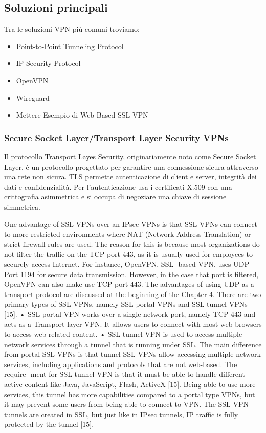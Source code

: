 \subsection{Soluzioni principali}
Tra le soluzioni VPN più comuni troviamo:
\begin{itemize}
    \item Point-to-Point Tunneling Protocol
    \item IP Security Protocol
    \item OpenVPN
    \item Wireguard
    \item Mettere Esempio di Web Based SSL VPN %
\end{itemize}

\subsubsection{Secure Socket Layer/Transport Layer Security VPNs}
Il protocollo Transport Layes Security, originariamente noto come Secure Socket Layer, è un protocollo progettato per garantire una connessione sicura attraverso una rete non sicura. TLS permette autenticazione di client e server, integrità dei dati e confidenzialità. Per l'autenticazione usa i certificati X.509 \cite[RFC5280]{RFC5280} con una crittografia asimmetrica e si occupa di negoziare una chiave di sessione simmetrica.


One advantage of SSL VPNs over an IPsec VPNs is that SSL VPNs can connect to more restricted environments where NAT (Network Address Translation) or strict firewall rules are used. The reason for this is because most organizations do not filter the traffic on the TCP port 443, as it is usually used for employees to securely access Internet. For instance, OpenVPN, SSL- based VPN, uses UDP Port 1194 for secure data transmission. However, in the case that port is filtered, OpenVPN can also make use TCP port 443. The advantages of using UDP as a transport protocol are discussed at the beginning of the Chapter 4.
There are two primary types of SSL VPNs, namely SSL portal VPNs and SSL tunnel VPNs [15].
• SSL portal VPN works over a single network port, namely TCP 443 and acts as a Transport layer VPN. It allows users to connect with most web browsers to access web related content.
• SSL tunnel VPN is used to access multiple network services through a tunnel that is running under SSL. The main difference from portal SSL VPNs is that tunnel SSL VPNs allow accessing multiple network services, including applications and protocols that are not web-based. The require- ment for SSL tunnel VPN is that it must be able to handle different active content like Java, JavaScript, Flash, ActiveX [15]. Being able to use more services, this tunnel has more capabilities compared to a portal type VPNs, but it may prevent some users from being able to connect to VPN. The SSL VPN tunnels are created in SSL, but just like in IPsec tunnels, IP traffic is fully protected by the tunnel [15].

